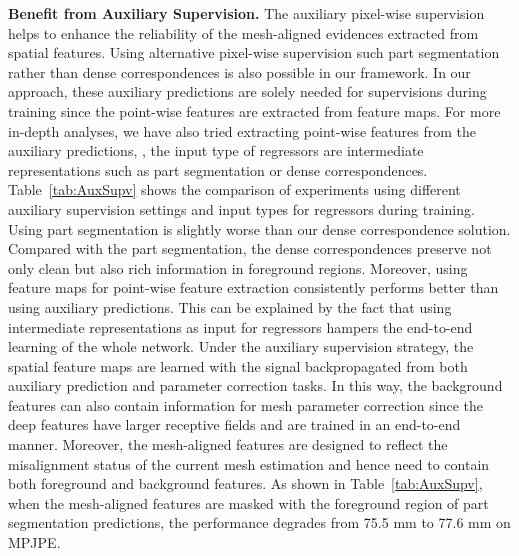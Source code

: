 \documentclass[10pt,twocolumn,letterpaper]{article}
\begin{document}
\textbf{Benefit from Auxiliary Supervision.}
The auxiliary pixel-wise supervision helps to enhance the reliability of the mesh-aligned evidences extracted from spatial features.
Using alternative pixel-wise supervision such part segmentation rather than dense correspondences is also possible in our framework.
In our approach, these auxiliary predictions are solely needed for supervisions during training since the point-wise features are extracted from feature maps.
For more in-depth analyses, we have also tried extracting point-wise features from the auxiliary predictions, \ie, the input type of regressors are intermediate representations such as part segmentation or dense correspondences.
Table~\ref{tab:AuxSupv} shows the comparison of experiments using different auxiliary supervision settings and input types for regressors during training.
Using part segmentation is slightly worse than our dense correspondence solution.
Compared with the part segmentation, the dense correspondences preserve not only clean but also rich information in foreground regions.
Moreover, using feature maps for point-wise feature extraction consistently performs better than using auxiliary predictions.
This can be explained by the fact that using intermediate representations as input for regressors hampers the end-to-end learning of the whole network.
Under the auxiliary supervision strategy, the spatial feature maps are learned with the signal backpropagated from both auxiliary prediction and parameter correction tasks.
In this way, the background features can also contain information for mesh parameter correction since the deep features have larger receptive fields and are trained in an end-to-end manner.
Moreover, the mesh-aligned features are designed to reflect the misalignment status of the current mesh estimation and hence need to contain both foreground and background features.
As shown in Table~\ref{tab:AuxSupv}, when the mesh-aligned features are masked with the foreground region of part segmentation predictions, the performance degrades from 75.5 mm to 77.6 mm on MPJPE.
\end{document}
